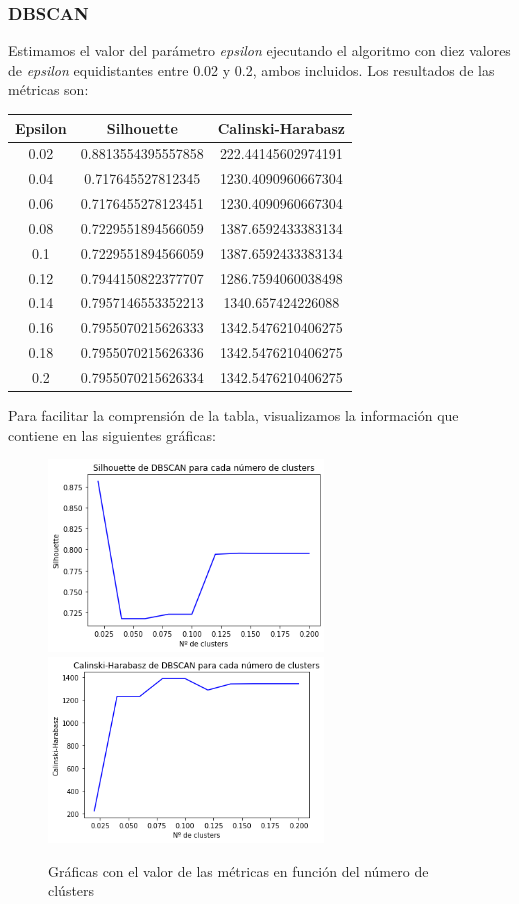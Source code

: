 \documentclass[a4]{article}
\begin{document}
\subsubsection{DBSCAN}

Estimamos el valor del parámetro \textit{epsilon} ejecutando el algoritmo con diez valores de \textit{epsilon} equidistantes entre 0.02 y 0.2, ambos incluidos. Los resultados de las métricas son:

\begin{center}
\begin{tabular}{|c|c|c|}
\hline
\multicolumn{1}{|c|}{\textbf{Epsilon}}& \textbf{Silhouette} & \textbf{Calinski-Harabasz}\\ \hline
  0.02 & 0.8813554395557858 & 222.44145602974191 \\ \hline
  0.04 & 0.717645527812345  & 1230.4090960667304 \\ \hline
  0.06 & 0.7176455278123451 & 1230.4090960667304 \\ \hline
  0.08 & 0.7229551894566059 & 1387.6592433383134 \\ \hline
  0.1  & 0.7229551894566059 & 1387.6592433383134 \\ \hline
  0.12 & 0.7944150822377707 & 1286.7594060038498 \\ \hline
  0.14 & 0.7957146553352213 & 1340.657424226088  \\ \hline
  0.16 & 0.7955070215626333 & 1342.5476210406275 \\ \hline
  0.18 & 0.7955070215626336 & 1342.5476210406275 \\ \hline
  0.2  & 0.7955070215626334 & 1342.5476210406275 \\ \hline
\end{tabular}
\end{center}

Para facilitar la comprensión de la tabla, visualizamos la información que contiene en las siguientes gráficas:

\begin{figure}[H]
  \centering
  \caption{Gráficas con el valor de las métricas en función del número de clústers}
  \includegraphics[width=73mm]{imagenes/c3_dbscan_sil}
  \includegraphics[width=73mm]{imagenes/c3_dbscan_cal}
\end{figure}
\end{document}
